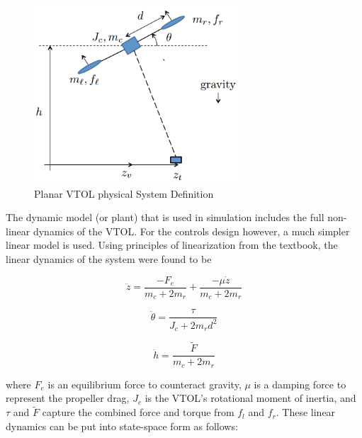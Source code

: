 \documentclass[dvips,12pt]{article}
\begin{document}
\begin{figure}[h] %
   \centering
   \includegraphics[trim = 0mm 0mm 0mm 0mm,clip,width=3in]{planar_vtol.png}
   \caption{Planar VTOL physical System Definition}
   \label{fig:vtol}
\end{figure}

The dynamic model (or plant) that is used in simulation includes the full non-linear dynamics of the VTOL.  For the controls design however, a much simpler linear model is used. Using principles of linearization from the textbook, the linear dynamics of the system were found to be

\begin{equation}
\ddot{z} = \frac{-F_e}{m_c + 2m_r}  + \frac{-\mu\dot{z}}{m_c + 2m_r}
\end{equation}

\begin{equation}
\ddot{\theta} = \frac{\tau}{J_c + 2m_r d^2}
\end{equation}

\begin{equation}
\ddot{h} = \frac{\tilde{F}}{m_c + 2m_r}
\end{equation}

where $F_e$ is an equilibrium force to counteract gravity, $\mu$ is a damping force to represent the propeller drag, $J_c$ is the VTOL's rotational moment of inertia, and $\tau$ and $\tilde{F}$ capture the combined force and torque from $f_l$ and $f_r$. These linear dynamics can be put into state-space form as follows:
\end{document}
